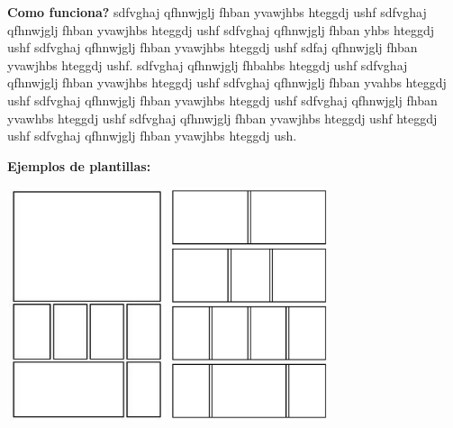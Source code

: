 \documentclass[utf8]{beamer}
\begin{document}
	\begin{frame}
		\textbf{Como funciona?}
		\newline
		\newline
		sdfvghaj  qfhnwjglj fhban yvawjhbs hteggdj ushf sdfvghaj  qfhnwjglj fhban yvawjhbs hteggdj ushf
		sdfvghaj  qfhnwjglj fhban yhbs hteggdj ushf sdfvghaj  qfhnwjglj fhban yvawjhbs hteggdj ushf
		sdfaj  qfhnwjglj fhban yvawjhbs hteggdj ushf.
		sdfvghaj  qfhnwjglj fhbahbs hteggdj ushf sdfvghaj  qfhnwjglj fhban yvawjhbs hteggdj ushf
		sdfvghaj  qfhnwjglj fhban yvahbs hteggdj ushf sdfvghaj  qfhnwjglj fhban yvawjhbs hteggdj ushf
		sdfvghaj  qfhnwjglj fhban yvawhbs hteggdj ushf sdfvghaj  qfhnwjglj fhban yvawjhbs hteggdj ushf
		hteggdj ushf sdfvghaj  qfhnwjglj fhban yvawjhbs hteggdj ush.
	\end{frame}
	\begin{frame}
		\textbf{Ejemplos de plantillas:}
		\newline
		\newline	
		\begin{center} 
			\includegraphics[width=0.35\textwidth]{1.jpg} %
			\includegraphics[width=0.35\textwidth]{2.jpg} %
		\end{center}
	\end{frame}
\end{document}
